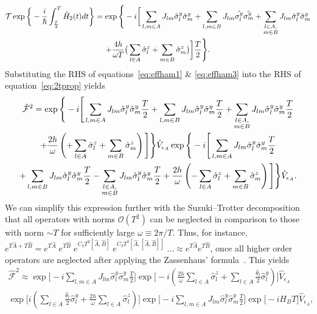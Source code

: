 \documentclass[12pt]{iopart}
\begin{document}
\begin{multline}
    \mathcal{T}\exp\bigg\{-\frac{i}{\hbar}\int_{\frac{T}{2}}^{T} \hat{H}_2(t) dt\bigg\} = \exp\Bigg\{-i \bigg[ \sum_{l,m\in A}J_{lm} \hat{\sigma}_l^y\hat{\sigma}_m^y +\sum_{l,m\in B}J_{lm}
    \hat{\sigma_l^y}\hat{\sigma_m^y}+\sum_{\substack{%
            l \in A,\\
            m \in B\hfill}} J_{lm}\hat{\sigma}^y_l\hat{\sigma}^y_m\\
    +\frac{4h}{\omega T}\big( \sum_{l\in A}^{}\hat{\sigma}^z_l + \sum_{m\in B}^{}\hat{\sigma}^z_m\big)\bigg]\frac{T}{2}\Bigg\}.
    \label{eq:effham3}
\end{multline}	
Substituting the RHS of equations~\eqref{eq:effham1} \& \eqref{eq:effham3} into the RHS of equation~\eqref{eq:2tprop} yields    	
\begin{multline}
    \hat{\mathcal{F}}^2 
    = \exp\Bigg\{-i \Bigg[ \sum_{l,m\in A}J_{lm} \hat{\sigma}^y_l\hat{\sigma}^y_m\frac{T}{2} +\sum_{l,m\in B}J_{lm} \hat{\sigma}^y_l\hat{\sigma}^y_m\frac{T}{2}+\sum_{\substack{%
            l \in A,\\
            m \in B\hfill}} J_{lm}\hat{\sigma}^y_l\hat{\sigma}^y_m\frac{T}{2} \\
            +\frac{2h}{\omega }\left( +\sum_{l\in A}^{}\hat{\sigma}^z_l + \sum_{m\in B}^{}\hat{\sigma}^z_m\right)\Bigg]\Bigg\} \hat{V}_{\epsilon_A} \exp\Bigg\{-i \Bigg[ \sum_{l,m\in A}J_{lm} \hat{\sigma}^y_l\hat{\sigma}^y_m\frac{T}{2}\\ +\sum_{l,m\in B}J_{lm} \hat{\sigma}^y_l\hat{\sigma}^y_m\frac{T}{2}
            -\sum_{\substack{%
            l \in A,\\
            m \in B\hfill}} J_{lm}\hat{\sigma}^y_l\hat{\sigma}^y_m\frac{T}{2} +\frac{2h}{\omega}\left( -\sum_{l\in A}^{}\hat{\sigma}^z_l + \sum_{m\in B}^{}\hat{\sigma}^z_m\right)\Bigg]\Bigg\} \hat{V}_{\epsilon_A}.\nonumber
\end{multline}
We can simplify this expression further with the Suzuki–Trotter decomposition\cite{Ostmeyer_2023, Hatano2005} that all operators with norms $\mathcal{O}(T^2)$ can be neglected in comparison to those with norm $\sim T$ for sufficiently large $\omega\equiv 2\pi/T$. Thus, for instance, $e^{T\hat{A} + T\hat{B}}= e^{T\hat{A}}\; e^{T\hat{B}}\;e^{C_2 T^2\left[\hat{A}, \hat{B}\right]}\;e^{C_3 T^3\left[\hat{A},\left[\hat{A}, \hat{B}\right]\right]}\;\dots \approx e^{T\hat{A}} e^{T\hat{B}}$, once all higher order operators are neglected after applying the Zassenhaus' formula~\cite{Magnus1954}. This yields
\begin{multline}	
    \hat{\mathcal{F}}^2 	\approx\exp\Bigg[-i \sum_{l,m\in A}J_{lm} \hat{\sigma}^y_l\hat{\sigma}^y_m\frac{T}{2}\Bigg] \exp\Bigg[-i\left(\frac{2h}{\omega } \sum_{l\in A}^{}\hat{\sigma}^z_l + \sum_{l \in A}\frac{\hat{\theta}_{l}}{2}\hat{\sigma}^y_l\right)\Bigg] 
    \hat{V}_{\epsilon_A} \\
    \exp\Bigg[i \left(\sum_{l \in A}\frac{\hat{\theta}_{l}}{2}\hat{\sigma}^y_l + \frac{2h}{\omega} \sum_{l\in A}^{}\hat{\sigma}^z_l\right)\Bigg] \exp\Bigg[-i\sum_{l,m\in A}J_{lm} \hat{\sigma}^y_l\hat{\sigma}^y_m\frac{T}{2}\Bigg] \exp\big[-i H_B T\big]\hat{V}_{\epsilon_A},\nonumber
\end{multline}
\end{document}
